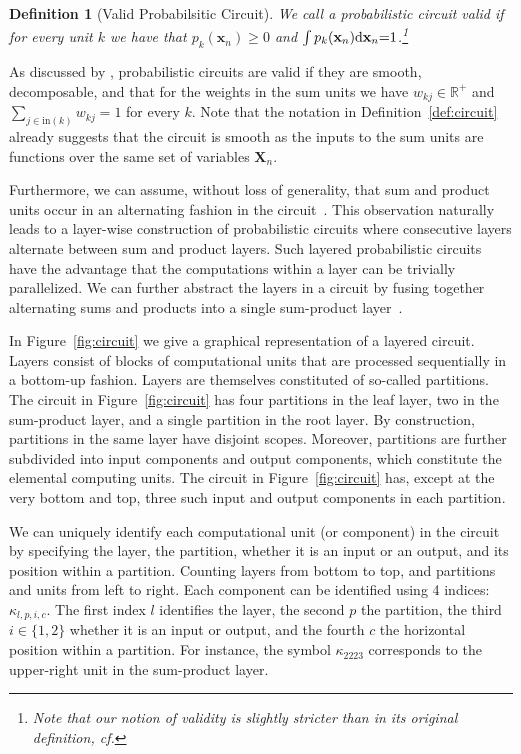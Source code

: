 \documentclass[letterpaper]{article} %
\newcommand{\cf}{cf.\xspace}
\newtheorem{definition}[theorem]{Definition}
\newcommand{\inputs}{\ensuremath{\text{in}}}
\newcommand{\Xvars}{\ensuremath{\mathbf{X}}}
\newcommand{\xvars}{\ensuremath{\mathbf{x}}}
\newcommand{\weight}{\ensuremath{w}}
\newcommand{\component}{\ensuremath{{\kappa}}}
\begin{document}
\begin{definition}[Valid Probabilsitic Circuit]
    We call a probabilistic circuit valid if for every unit $k$ we have that $p_k(\xvars_n){\geq} 0$ and $\int p_k(\xvars_n) \differential \xvars_n{=}1$.\footnote{Note that our notion of validity is slightly stricter than in its original definition, \cf \citep{poon2011sum}}
\end{definition}

As discussed by \citet{peharz2015theoretical}, probabilistic circuits are valid if they are smooth, decomposable, and that for the weights in the sum units we have $\weight_{kj} \in \mathbb{R}^+$ and $\sum_{j\in\inputs(k)} \weight_{kj} = 1$ for every $k$. Note that the notation in Definition~\ref{def:circuit} already suggests that the circuit is smooth as the inputs to the sum units are functions over the same set of variables $\Xvars_n$.

Furthermore, we can assume, without loss of generality, that sum and product units occur in an alternating fashion in the circuit~\citep{peharz2020einsum}.
This observation naturally leads to a layer-wise construction of probabilistic circuits where consecutive layers alternate between sum and product layers.
Such layered probabilistic circuits~\citep{peharz2019random} have the advantage that the computations within a layer can be trivially parallelized.
We can further abstract the layers in a circuit by fusing together alternating sums and products into a single sum-product layer~\citep{peharz2020einsum}.

In Figure~\ref{fig:circuit} we give a graphical representation of a layered circuit. Layers consist of  blocks of computational units that are processed sequentially in a bottom-up fashion. Layers are themselves constituted of so-called partitions. The circuit in Figure~\ref{fig:circuit} has four partitions in the leaf layer, two in the sum-product layer, and a single partition in the root layer. By construction, partitions in the same layer have disjoint scopes. Moreover, partitions are further subdivided into input components and output components, which constitute the elemental computing units. The circuit in Figure~\ref{fig:circuit} has, except at the very bottom and top, three such input and output components in each partition.

We can uniquely identify each computational unit (or component) in the circuit by specifying the layer, the partition, whether it is an input or an output, and its position within a partition. Counting layers from bottom to top, and partitions and units from left to right. Each component can be identified using 4 indices: $\component_{l,p,i,c}$. The first index $l$ identifies the layer, the second $p$ the partition, the third $i \in \{1,2 \}$ whether it is an input or output, and the fourth $c$ the horizontal position within a partition.
For instance, the symbol $\component_{2223}$ corresponds to  the upper-right unit in the sum-product layer.
\end{document}

